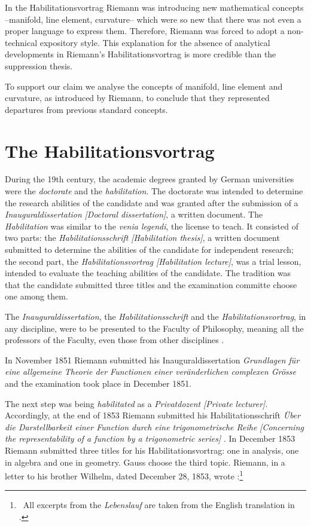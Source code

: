 \documentclass[12pt]{article}
\begin{document}
In the Habilitationsvortrag Riemann was introducing new mathematical concepts --manifold, line element, curvature-- which were so new that there was not even a proper language to express them. Therefore, Riemann was forced to adopt a non-technical expository style. This explanation for the absence of analytical developments in Riemann's Habilitationsvortrag is more credible than the suppression thesis.

To support our claim we analyse the concepts of manifold, line element and curvature, as introduced by Riemann, to conclude that they represented departures from previous standard concepts.

\section{The Habilitationsvortrag}

During the 19th century, the academic degrees granted by German universities were the {\it doctorate} and the {\it habilitation}. The doctorate was intended to determine the research abilities of the candidate and was granted after the submission of a {\it Inauguraldissertation} {\it [Doctoral dissertation]}, a written document. The {\it Habilitation} was similar to the {\it venia legendi}, the license to teach. It consisted of two parts: the {\it Habilitationsschrift} {\it [Habilitation thesis]}, a written document submitted to determine the abilities of the candidate for independent research; the second part, the {\it Habilitationsvortrag} {\it [Habilitation lecture]}, was a trial lesson, intended to evaluate the teaching abilities of the candidate. The tradition was that the candidate submitted three titles and the examination committe choose one among them.

The {\it Inauguraldissertation}, the {\it Habilitationsschrift} and the {\it Habilitationsvortrag}, in any discipline, were to be presented to the Faculty of Philosophy, meaning all the professors of the Faculty, even those from other disciplines \cite{Weber1990}. 

In November 1851 Riemann submitted his Inauguraldissertation {\it Grundlagen f\"ur eine allgemeine Theorie der Functionen einer ver\"anderlichen complexen Gr\"osse} \cite{Riemann1851} and the examination took place in December 1851.

The next step was being {\it habilitated} as a {\it Privatdozent} {\it [Private lecturer]}. Accordingly, at the end of 1853 Riemann submitted his Habilitationsschrift {\it \"Uber die Darstellbarkeit einer Function durch eine trigonometrische Reihe} {\it [Concerning the representability of a function by a trigonometric series]} \cite{Riemann1854a}. In December 1853 Riemann submitted three titles for his Habilitationsvortrag: one in analysis, one in algebra and one in geometry. Gauss choose the third topic. Riemann, in a letter to his brother Wilhelm, dated December 28, 1853, wrote \cite{Dedekind1876b}:\footnote{\ All excerpts from the {\it Lebenslauf} are taken from the English translation in \cite{Riemann2004}.}
\end{document}
